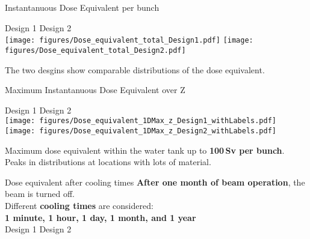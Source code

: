 \documentclass[xcolor={dvipsnames}]{beamer}
\begin{document}
\begin{frame}{Instantanuous Dose Equivalent per bunch}
\begin{center}
\hspace*{1.8cm} Design 1 \hfill Design 2 \hspace*{1.8cm} \\
  \texttt{[image: figures/Dose\_equivalent\_total\_Design1.pdf]}
    \texttt{[image: figures/Dose\_equivalent\_total\_Design2.pdf]}
\end{center}
The two desgins show comparable distributions of the dose equivalent.
\end{frame}
\begin{frame}{Maximum Instantanuous Dose Equivalent over Z}
\begin{center}
\hspace*{1.8cm} Design 1 \hfill Design 2 \hspace*{1.8cm} \\
  \texttt{[image: figures/Dose\_equivalent\_1DMax\_z\_Design1\_withLabels.pdf]}
    \texttt{[image: figures/Dose\_equivalent\_1DMax\_z\_Design2\_withLabels.pdf]}
\end{center}
Maximum dose equivalent within the water tank up to \textbf{100\,Sv per bunch}. Peaks in distributions at locations with lots of material.
\end{frame}
\begin{frame}{Dose equivalent after cooling times}
\textbf{After one month of beam operation}, the beam is turned off.\\
Different \textbf{cooling times} are considered:\\
\textbf{1 minute, 1 hour, 1 day, 1 month, and 1 year}\\
\vspace*{0.3cm}
\hspace*{1.6cm} Design 1 \hfill Design 2 \hspace*{1.8cm} \\
  \begin{center}
  \end{center}
\end{frame}
\end{document}
